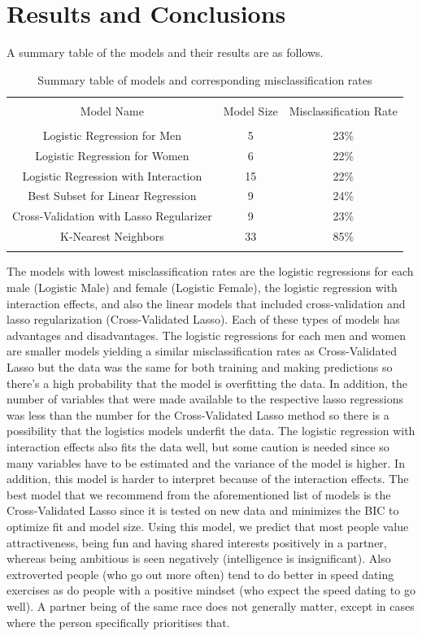 \documentclass{article}
\begin{document}
\section{Results and Conclusions}
A summary table of the models and their results are as follows.
\begin{table}[!htbp] \centering 
	\caption{Summary table of models and corresponding misclassification rates} 
	\label{table:results} 
	\begin{tabular}{ccc} 
		\\[-1.8ex]\hline 
		\hline \\[-1.8ex] 
		Model Name & Model Size & Misclassification Rate \\ 
		\hline \\[-1.8ex] 
		Logistic Regression for Men & 5 & 23\% \\ 
		Logistic Regression for Women &6 & 22\% \\ 
		Logistic Regression with Interaction & 15 & 22\%\\
		Best Subset for Linear Regression& 9 & 24\% \\
		Cross-Validation with Lasso Regularizer & 9 & 23\% \\
		K-Nearest Neighbors & 33 & 85\% \\  
		\hline \\[-1.8ex] 
	\end{tabular} 
\end{table} 
The models with lowest misclassification rates are the logistic regressions for each male (Logistic Male) and female (Logistic Female), the logistic regression with interaction effects, and also the linear models that included cross-validation and lasso regularization (Cross-Validated Lasso).  Each of these types of models has advantages and disadvantages.  The logistic regressions for each men and women are smaller models yielding a similar misclassification rates as Cross-Validated Lasso but the data was the same for both training and making predictions so there's a high probability that the model is overfitting the data.  In addition, the number of variables that were made available to the respective lasso regressions was less than the number for the Cross-Validated Lasso method so there is a possibility that the logistics models underfit the data.  The logistic regression with interaction effects also fits the data well, but some caution is needed since so many variables have to be estimated and the variance of the model is higher.  In addition, this model is harder to interpret because of the interaction effects.  The best model that we recommend from the aforementioned list of models is the Cross-Validated Lasso since it is tested on new data and minimizes the BIC to optimize fit and model size. Using this model, we predict that most people value attractiveness, being fun and having shared interests positively in a partner, whereas being ambitious is seen negatively (intelligence is insignificant). Also extroverted people (who go out more often) tend to do better in speed dating exercises as do people with a positive mindset (who expect the speed dating to go well). A partner being of the same race does not generally matter, except in cases where the person specifically prioritises that.
\end{document}
